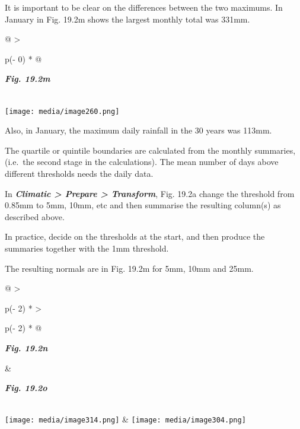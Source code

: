 \documentclass[
  letterpaper,
  DIV=11,
  numbers=noendperiod]{scrreprt}
\begin{document}
It is important to be clear on the differences between the two maximums.
In January in Fig. 19.2m shows the largest monthly total was 331mm.

\begin{longtable}[]{@{}
  >{\raggedright\arraybackslash}p{(\columnwidth - 0\tabcolsep) * }@{}}
\toprule\noalign{}
\begin{minipage}[b]{\linewidth}\raggedright
\textbf{\emph{Fig. 19.2m}}
\end{minipage} \\
\midrule\noalign{}
\endhead
\bottomrule\noalign{}
\endlastfoot
\texttt{[image: media/image260.png]} \\
\end{longtable}

Also, in January, the maximum daily rainfall in the 30 years was 113mm.

The quartile or quintile boundaries are calculated from the monthly
summaries, (i.e.~the second stage in the calculations). The mean number
of days above different thresholds needs the daily data.

In \textbf{\emph{Climatic \textgreater{} Prepare \textgreater{}
Transform}}, Fig. 19.2a change the threshold from 0.85mm to 5mm, 10mm,
etc and then summarise the resulting column(s) as described above.

In practice, decide on the thresholds at the start, and then produce the
summaries together with the 1mm threshold.

The resulting normals are in Fig. 19.2m for 5mm, 10mm and 25mm.

\begin{longtable}[]{@{}
  >{\raggedright\arraybackslash}p{(\columnwidth - 2\tabcolsep) * }
  >{\raggedright\arraybackslash}p{(\columnwidth - 2\tabcolsep) * }@{}}
\toprule\noalign{}
\begin{minipage}[b]{\linewidth}\raggedright
\textbf{\emph{Fig. 19.2n}}
\end{minipage} & \begin{minipage}[b]{\linewidth}\raggedright
\textbf{\emph{Fig. 19.2o}}
\end{minipage} \\
\midrule\noalign{}
\endhead
\bottomrule\noalign{}
\endlastfoot
\texttt{[image: media/image314.png]} &
\texttt{[image: media/image304.png]} \\
\end{longtable}
\end{document}
